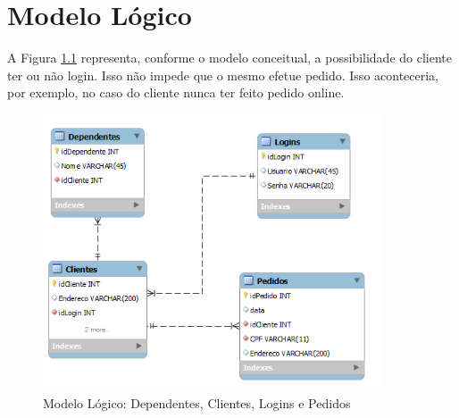 \documentclass[
	12pt,				%
	openright,			%
	oneside,			%
	a4paper,			%
	chapter=TITLE,		%
	section=TITLE,		%
	english,			%
	brazil				%
	]{abntex2}
\begin{document}
\chapter{Modelo Lógico}
    
    A Figura \ref{ml_01} representa, conforme o modelo conceitual, a possibilidade do 
    cliente ter ou não login. Isso não impede que o mesmo efetue pedido. Isso aconteceria, 
    por exemplo, no caso do cliente nunca ter feito pedido online.
    \begin{figure}[h]
         \centering
         \includegraphics[width=10cm,keepaspectratio]{Imgs/ML_01}
         \caption{Modelo Lógico: Dependentes, Clientes, Logins e Pedidos}
         \label{ml_01}
    \end{figure}
    
    \newpage
    
\end{document}
